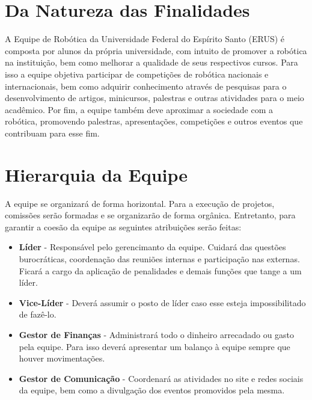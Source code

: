 \chapter{Da Natureza das Finalidades}
\label{chp:natureza}

A Equipe de Robótica da Universidade Federal do Espírito Santo (ERUS) é composta por alunos da própria universidade, com intuito de promover a robótica na instituição, bem como melhorar a qualidade de seus respectivos cursos. Para isso a equipe objetiva participar de competições de robótica nacionais e internacionais, bem como adquirir conhecimento através de pesquisas para o desenvolvimento de artigos, minicursos, palestras e outras atividades para o meio acadêmico. Por fim, a equipe também deve aproximar a sociedade com a robótica, promovendo palestras, apresentações, competições e outros eventos que contribuam para esse fim. 


\chapter{Hierarquia da Equipe}
\label{chp:hierarquia}

A equipe se organizará de forma horizontal. Para a execução de projetos, comissões serão formadas e se organizarão de forma orgânica. Entretanto, para garantir a coesão da equipe as seguintes atribuições serão feitas:

\begin{itemize}
  \item[] \textbf{Líder} - Responsável pelo gerencimanto da equipe. Cuidará das questões burocráticas, coordenação das reuniões internas e participação nas externas. Ficará a cargo da aplicação de penalidades e demais funções que tange a um líder. 
  \item[] \textbf{Vice-Líder} - Deverá assumir o posto de líder caso esse esteja impossibilitado de fazê-lo.
  \item[] \textbf{Gestor de Finanças} - Administrará todo o dinheiro arrecadado ou gasto pela equipe. Para isso deverá apresentar um balanço à equipe sempre que houver movimentações.
  \item[] \textbf{Gestor de Comunicação} - Coordenará as atividades no site e redes sociais da equipe, bem como a divulgação dos eventos promovidos pela mesma.
\end{itemize}


